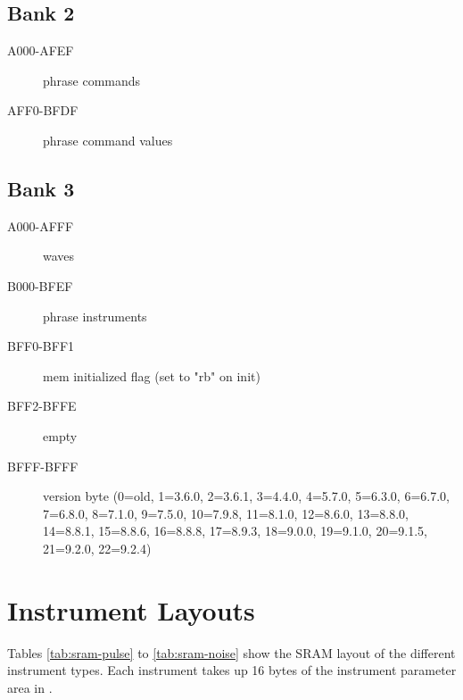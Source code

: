 \subsection{Bank 2}

\begin{description}
    \item[A000-AFEF] phrase commands
    \item[AFF0-BFDF] phrase command values
\end{description}

\subsection{Bank 3}

\begin{description}
    \item[A000-AFFF] waves
    \item[B000-BFEF] phrase instruments
    \item[BFF0-BFF1] mem initialized flag (set to "rb" on init)
    \item[BFF2-BFFE] empty
    \item[BFFF-BFFF] version byte (0=old, 1=3.6.0, 2=3.6.1, 3=4.4.0, 4=5.7.0, 5=6.3.0, 6=6.7.0, 7=6.8.0, 8=7.1.0, 9=7.5.0, 10=7.9.8, 11=8.1.0, 12=8.6.0, 13=8.8.0, 14=8.8.1, 15=8.8.6, 16=8.8.8, 17=8.9.3, 18=9.0.0, 19=9.1.0, 20=9.1.5, 21=9.2.0, 22=9.2.4)
\end{description}

\section{Instrument Layouts}

Tables \ref{tab:sram-pulse} to \ref{tab:sram-noise} show the SRAM layout of the different instrument types. Each instrument takes up 16 bytes of the instrument parameter area in .

